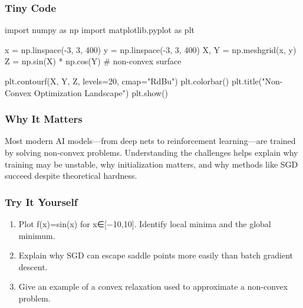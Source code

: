 \documentclass[
  letterpaper,
  DIV=11,
  numbers=noendperiod]{scrreprt}
\newenvironment{Shaded}{\begin{snugshade}}{\end{snugshade}}
\newcommand{\CommentTok}[1]{\textcolor[rgb]{0.37,0.37,0.37}{#1}}
\newcommand{\DecValTok}[1]{\textcolor[rgb]{0.68,0.00,0.00}{#1}}
\newcommand{\ImportTok}[1]{\textcolor[rgb]{0.00,0.46,0.62}{#1}}
\newcommand{\NormalTok}[1]{\textcolor[rgb]{0.00,0.23,0.31}{#1}}
\newcommand{\OperatorTok}[1]{\textcolor[rgb]{0.37,0.37,0.37}{#1}}
\newcommand{\StringTok}[1]{\textcolor[rgb]{0.13,0.47,0.30}{#1}}
\providecommand{\tightlist}{%
  \setlength{\itemsep}{0pt}\setlength{\parskip}{0pt}}
\begin{document}
\subsubsection{Tiny Code}\label{tiny-code-146}

\begin{Shaded}
\begin{Highlighting}[]
\ImportTok{import}\NormalTok{ numpy }\ImportTok{as}\NormalTok{ np}
\ImportTok{import}\NormalTok{ matplotlib.pyplot }\ImportTok{as}\NormalTok{ plt}

\NormalTok{x }\OperatorTok{=}\NormalTok{ np.linspace(}\OperatorTok{{-}}\DecValTok{3}\NormalTok{, }\DecValTok{3}\NormalTok{, }\DecValTok{400}\NormalTok{)}
\NormalTok{y }\OperatorTok{=}\NormalTok{ np.linspace(}\OperatorTok{{-}}\DecValTok{3}\NormalTok{, }\DecValTok{3}\NormalTok{, }\DecValTok{400}\NormalTok{)}
\NormalTok{X, Y }\OperatorTok{=}\NormalTok{ np.meshgrid(x, y)}
\NormalTok{Z }\OperatorTok{=}\NormalTok{ np.sin(X) }\OperatorTok{*}\NormalTok{ np.cos(Y)  }\CommentTok{\# non{-}convex surface}

\NormalTok{plt.contourf(X, Y, Z, levels}\OperatorTok{=}\DecValTok{20}\NormalTok{, cmap}\OperatorTok{=}\StringTok{"RdBu"}\NormalTok{)}
\NormalTok{plt.colorbar()}
\NormalTok{plt.title(}\StringTok{"Non{-}Convex Optimization Landscape"}\NormalTok{)}
\NormalTok{plt.show()}
\end{Highlighting}
\end{Shaded}

\subsubsection{Why It Matters}\label{why-it-matters-44}

Most modern AI models---from deep nets to reinforcement learning---are
trained by solving non-convex problems. Understanding the challenges
helps explain why training may be unstable, why initialization matters,
and why methods like SGD succeed despite theoretical hardness.

\subsubsection{Try It Yourself}\label{try-it-yourself-146}

\begin{enumerate}
\def\labelenumi{\arabic{enumi}.}
\tightlist
\item
  Plot f(x)=sin(x) for x∈{[}−10,10{]}. Identify local minima and the
  global minimum.
\item
  Explain why SGD can escape saddle points more easily than batch
  gradient descent.
\item
  Give an example of a convex relaxation used to approximate a
  non-convex problem.
\end{enumerate}
\end{document}
